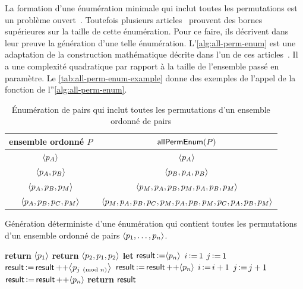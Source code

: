 La formation d'une énumération minimale qui inclut toutes les permutations est un problème ouvert~\autocite{engen2018_containing}.
Toutefois plusieurs articles~\autocite{adleman_1974_shortperm,koutas1975shortest,galbiati1976permutation,zualinescu2011shorter,radomirovic2012construction} prouvent des bornes supérieures sur la taille de cette énumération.
Pour ce faire, ils décrivent dans leur preuve la génération d'une telle énumération.
L'\autoref{alg:all-perm-enum} est une adaptation de la construction mathématique décrite dans l'un de ces articles~\autocite{adleman_1974_shortperm}.
Il a une complexité quadratique par rapport à la taille de l'ensemble passé en paramètre.
Le \autoref{tab:all-perm-enum-example} donne des exemples de l'appel de la fonction de l''\autoref{alg:all-perm-enum}.

\clearpage

\begin{table}[ht]
    \centering
    \begin{tabular}{cc}
        ensemble ordonné $P$ & $\trm{allPermEnum}(P)$ \\
        \toprule
        $\tuple*{p_A}$ & $\tuple*{p_A}$ \\
        $\tuple*{p_A, p_B}$ & $\tuple*{p_B, p_A, p_B}$ \\
        $\tuple*{p_A, p_B, p_M}$ & $\tuple*{p_M, p_A, p_B, p_M, p_A, p_B, p_M}$ \\
        $\tuple*{p_A, p_B, p_C, p_M}$ & $\tuple*{p_M, p_A, p_B, p_C, p_M, p_A, p_B, p_M, p_C, p_A, p_B, p_M}$ \\
    \end{tabular}
    \caption{Énumération de pairs qui inclut toutes les permutations d'un ensemble ordonné de pairs}\label{tab:all-perm-enum-example}
\end{table}

\begin{algorithm}[ht]
\caption{Génération déterministe d'une énumération qui contient toutes les permutations d'un ensemble ordonné de pairs $\tuple*{p_1, \dotsc, p_n}$.}\label{alg:all-perm-enum}
\begin{algorithmic}[1]
        \State \textbf{return} $\tuple*{p_1}$
        \State \textbf{return} $\tuple*{p_2, p_1, p_2}$
    \Else{}
        \State \textbf{let} $\trm{result} \assign \tuple*{p_n}$
        \State $i \assign 1$
        \State $j \assign 1$
            \State $\trm{result} \assign \trm{result} \lappend \tuple*{p_{j \pmod{n}}}$
                \State $\trm{result} \assign \trm{result} \lappend \tuple*{p_n}$
                \State $i \assign i + 1$
            \EndIf
            \State $j \assign j + 1$
        \EndWhile
        \State $\trm{result} \assign \trm{result} \lappend \tuple*{p_n}$
        \State \textbf{return} $\trm{result}$
    \EndIf
\EndFunction
\end{algorithmic}
\end{algorithm}

